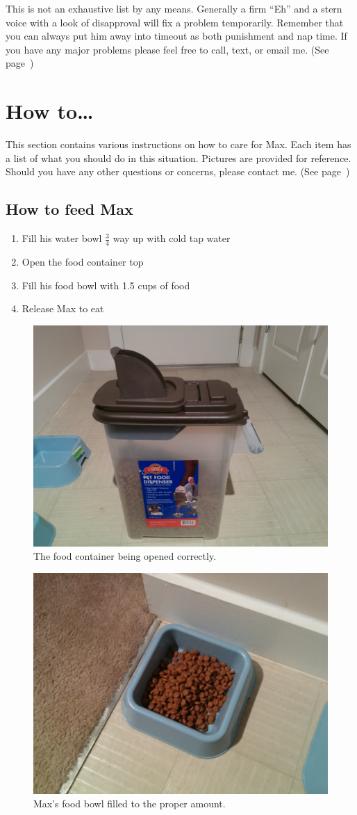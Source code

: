\documentclass[pdftex,12pt]{article}
\begin{document}
\bigskip

This is not an exhaustive list by any means.
Generally a firm ``Eh'' and a stern voice with a look of disapproval will fix a problem temporarily.
Remember that you can always put him away into timeout as both punishment and nap time.
If you have any major problems please feel free to call, text, or email me.
(See page~\pageref{tab:information})

\newpage
\section{How to\ldots}

This section contains various instructions on how to care for Max.
Each item has a list of what you should do in this situation.
Pictures are provided for reference.
Should you have any other questions or concerns, please contact me.
(See page~\pageref{tab:information})

\subsection{How to feed Max}
\begin{enumerate}\label{itm:how_to_feed}
    \item Fill his water bowl $\frac{3}{4}$ way up with cold tap water
    \item Open the food container top
    \item Fill his food bowl with 1.5 cups of food
    \item Release Max to eat
\end{enumerate}

\bigskip

\begin{figure}[h!]
    \centering
    \includegraphics[width=.35\textwidth]{./images/how_to/feed_max/food_container_open.jpg}
    \caption*{The food container being opened correctly.}\label{fig:food_container_open}
\end{figure}

\bigskip

\begin{figure}[h!]
    \centering
    \includegraphics[width=.35\textwidth]{./images/how_to/feed_max/food_bowl_filled.jpg}
    \caption*{Max's food bowl filled to the proper amount.}\label{fig:food_bowl_filled}
\end{figure}
\end{document}
